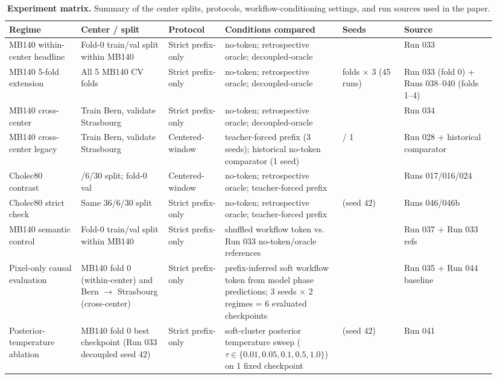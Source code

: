 \begin{table}[t]
\centering
\scriptsize
\setlength{\tabcolsep}{2pt}
\caption{\textbf{Experiment matrix.} Summary of the center splits,
protocols, workflow-conditioning settings, and run sources used in the
paper.}
\label{tab:experiment-matrix}
\begin{tabular}{@{}>{\raggedright\arraybackslash}p{0.14\linewidth}>{\raggedright\arraybackslash}p{0.17\linewidth}>{\raggedright\arraybackslash}p{0.11\linewidth}>{\raggedright\arraybackslash}p{0.22\linewidth}>{\raggedright\arraybackslash}p{0.12\linewidth}>{\raggedright\arraybackslash}p{0.18\linewidth}@{}}
\toprule
Regime & Center / split & Protocol & Conditions compared & Seeds & Source \\
\midrule
MB140 within-center headline & Fold-0 train/val split within MB140 & Strict prefix-only & no-token; retrospective oracle; decoupled-oracle & 3 & Run 033 \\
MB140 5-fold extension & All 5 MB140 CV folds & Strict prefix-only & no-token; retrospective oracle; decoupled-oracle & 5 folds $\times$ 3 (45 runs) & Run 033 (fold 0) + Runs 038--040 (folds 1--4) \\
MB140 cross-center & Train Bern, validate Strasbourg & Strict prefix-only & no-token; retrospective oracle; decoupled-oracle & 3 & Run 034 \\
MB140 cross-center legacy & Train Bern, validate Strasbourg & Centered-window & teacher-forced prefix (3 seeds); historical no-token comparator (1 seed) & 3 / 1 & Run 028 + historical comparator \\
Cholec80 contrast & 36/6/30 split; fold-0 val & Centered-window & no-token; retrospective oracle; teacher-forced prefix & 3 & Runs 017/016/024 \\
Cholec80 strict check & Same 36/6/30 split & Strict prefix-only & no-token; retrospective oracle; teacher-forced prefix & 1 (seed 42) & Runs 046/046b \\
MB140 semantic control & Fold-0 train/val split within MB140 & Strict prefix-only & shuffled workflow token vs. Run 033 no-token/oracle references & 3 & Run 037 + Run 033 refs \\
Pixel-only causal evaluation & MB140 fold 0 (within-center) and Bern $\rightarrow$ Strasbourg (cross-center) & Strict prefix-only & prefix-inferred soft workflow token from model phase predictions; 3 seeds $\times$ 2 regimes = 6 evaluated checkpoints & 3 & Run 035 + Run 044 baseline \\
Posterior-temperature ablation & MB140 fold 0 best checkpoint (Run 033 decoupled seed 42) & Strict prefix-only & soft-cluster posterior temperature sweep ($\tau \in \{0.01, 0.05, 0.1, 0.5, 1.0\}$) on 1 fixed checkpoint & 1 (seed 42) & Run 041 \\
\bottomrule
\end{tabular}
\end{table}

